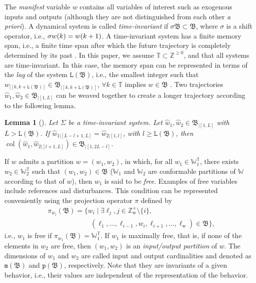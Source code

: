\documentclass[11pt,print,draftcls,onecolumn,romanappendices]{ieeecolor}
\newtheorem{lem}[thm]{Lemma}
\DeclareMathOperator{\col}{col}
\newcommand{\W}{\mathbb{W}}
\newcommand{\T}{\mathbb{T}}
\newcommand{\Zp}[1]{\mathbb{Z}^+_{#1}}
\newcommand{\lag}[1]{\mathtt{L}\left(#1\right)}
\newcommand{\proj}[2]{\pi_{#1}\left(#2\right)}
\newcommand{\revise}[1]{{\color{black} #1}}
\newcommand{\B}{\mathfrak{B}}
\newcommand{\bint}[1]{{|[#1]}}
\begin{document}
The \emph{manifest} variable $w$ contains all variables of interest such as exogenous inputs and outputs (although they are not distinguished from each other \emph{a priori}). A dynamical system is called \emph{time-invariant} if $\sigma\B\subset\B$, where $\sigma$ is a shift operator, i.e., $\sigma w\revise{(k)}=w\revise{(k+1)}$. A time-invariant system has a finite memory span, i.e., a finite time span \revise{after which the future trajectory is completely determined by its past} \cite{Willems:1991}. In this paper, \revise{we assume $\mathbb{T}\subset\mathbb{Z}^{\geq 0}$}, and that all systems are  time-invariant. In this case, the memory span can be represented in terms of the \emph{lag} of the system $\lag{\B}$, i.e., the smallest integer such that $w_\bint{k,k+\lag{\B}}\in \B_\bint{k,k+\lag{\B}}$, $\forall k\in\T$ implies $w\in\B$ \cite{Maupong:2017}. Two trajectories $\hat{w}_1,\hat{w}_2\in\B_\bint{1,L}$ can be weaved together to create a longer trajectory according to the following lemma.
\begin{lem}[\cite{Markovsky:2005}]\label{lem:weaving}
	Let $\Sigma$ be a time-invariant system. Let $\hat{w}_1,\hat{w}_2\in\B_\bint{1,L}$ with $L>\lag{\B}$. If $\hat{w}_{1\bint{L-l+1,L}}=\hat{w}_{2\bint{1,l}}$, with $l\geq\lag{\B}$, then $\col\left(\hat{w}_1,\hat{w}_{2\bint{l+1,L}}\right)\in\B_\bint{1,2L-l}$.
\end{lem}

If $w$ admits a partition $w=(w_1,w_2)$, in which, for all $w_1\in\W_1^\T$, there exists $w_2\in\W_2^\T$ such that $(w_1,w_2)\in\B$ ($\W_1$ and $\W_2$ are conformable partitions of $\W$ according to that of $w$), then $w_1$ is said to be \emph{free}. Examples of free variables include references and disturbances. This condition can be represented conveniently using the projection operator $\pi$ defined by
\begin{equation}
	\begin{split}
		&\proj{w_i}{\B}=\{w_i\mid\exists \ell_j, j\in\Zp{\mathrm{w}}\setminus\{i\},\\ &\qquad\qquad\qquad \ (\ell_1,\ldots,\ell_{i-1},w_i,\ell_{i+1},\ldots,\ell_\mathrm{w})\in\B\},
	\end{split}
\end{equation}
i.e., $w_1$ is free if $\proj{w_1}{\B}=\W_1^\T$. If $w_1$ is maximally free, that is, if none of the elements in $w_2$ are free, then $\left(w_1,w_2\right)$ is an \emph{input/output partition} of $w$. The dimensions of $w_1$ and $w_2$ are called input and output cardinalities and denoted as $\mathtt{m}(\B)$ and $\mathtt{p}(\B)$, respectively. \revise{Note that they are invariants of a given behavior, i.e., their values are independent of the representation of the behavior.}
\end{document}
